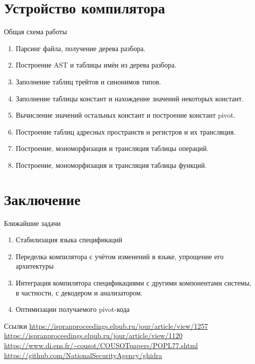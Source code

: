 \documentclass[presentation]{beamer}
\begin{document}
\section{Устройство компилятора}
\label{sec:org01d0b88}
\begin{frame}[label={sec:org4032737}]{Общая схема работы}
\begin{enumerate}
\item Парсинг файла, получение дерева разбора.
\item Построение AST и таблицы имён из дерева разбора.
\item Заполнение таблиц трейтов и синонимов типов.
\item Заполнение таблицы констант и нахождение значений некоторых констант.
\item Вычисление значений остальных констант и построение констант pivot.
\item Построение таблиц адресных пространств и регистров и их трансляция.
\item Построение, мономорфизация и трансляция таблицы операций.
\item Построение, мономорфизация и трансляция таблицы функций.
\end{enumerate}
\end{frame}
\section{Заключение}
\label{sec:orgc9db460}
\begin{frame}[label={sec:org45a0c69}]{Ближайшие задачи}
\begin{enumerate}
\item Стабилизация языка спецификаций
\item Переделка компилятора с учётом изменений в языке, упрощение его архитектуры
\item Интеграция компилятора спецификациями с другими компонентами системы, в частности, с декодером и анализатором.
\item Оптимизации получаемого pivot-кода
\end{enumerate}
\end{frame}
\begin{frame}[label={sec:orga01b131}]{Ссылки}
\url{https://ispranproceedings.elpub.ru/jour/article/view/1257}
\url{https://ispranproceedings.elpub.ru/jour/article/view/1120}
\url{https://www.di.ens.fr/\~cousot/COUSOTpapers/POPL77.shtml}
\url{https://github.com/NationalSecurityAgency/ghidra}
\end{frame}
\end{document}
